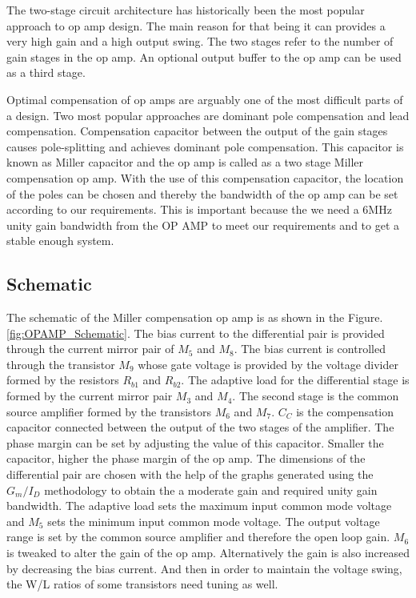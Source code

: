 The two-stage circuit architecture has historically been the most popular approach to op amp design. The main reason for that being it can provides a very high gain and a high output swing. The two stages refer to the number of gain stages in the op amp. An optional output buffer to the op amp can be used as a third stage. 

Optimal compensation of op amps are arguably one of the most difficult parts of a design. Two most popular approaches are dominant pole compensation and lead compensation. Compensation capacitor between the output of the gain stages causes pole-splitting and achieves dominant pole compensation. This capacitor is known as Miller capacitor and the op amp is called as a two stage Miller compensation op amp. With the use of this compensation capacitor, the location of the poles can be chosen and thereby the bandwidth of the op amp can be set according to our requirements. This is important because the we need a 6MHz unity gain bandwidth from the OP AMP to meet our requirements and to get a stable enough system.

\subsection{Schematic}
The schematic of the Miller compensation op amp is as shown in the Figure.\ref{fig:OPAMP_Schematic}. The bias current to the differential pair is provided through the current mirror pair of $M_5$ and $M_8$. The bias current is controlled through the transistor $M_9$ whose gate voltage is provided by the voltage divider formed by the resistors $R_{b1}$ and $R_{b2}$. The adaptive load for the differential stage is formed by the current mirror pair $M_3$ and $M_4$. The second stage is the common source amplifier formed by the transistors $M_6$ and $M_7$. $C_C$ is the compensation capacitor connected between the output of the two stages of the amplifier. The phase margin can be set by adjusting the value of this capacitor.  Smaller the capacitor, higher the phase margin of the op amp. The dimensions of the differential pair are chosen with the help of the graphs generated using the $G_m/I_D$ methodology to obtain the a moderate gain and required unity gain bandwidth. The adaptive load sets the maximum input common mode voltage and $M_5$ sets the minimum input common mode voltage. The output voltage range is set by the common source amplifier and therefore the open loop gain. $M_6$ is tweaked to alter the gain of the op amp. Alternatively the gain is also increased by decreasing the bias current. And then in order to maintain the voltage swing, the W/L ratios of some transistors need tuning as well.

